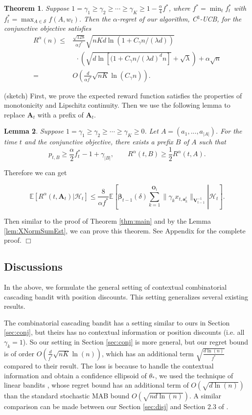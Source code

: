 \documentclass{article}
\newcommand{\bbeta}{\boldsymbol{\beta}}
\newcommand{\EE}{\mathbb{E}}
\newcommand{\bA}{\mathbf{A}}
\newcommand{\ba}{\mathbf{a}}
\newcommand{\bO}{\mathbf{O}}
\newcommand{\bV}{\mathbf{V}}
\newcommand{\cH}{\mathcal{H}}
\newcommand{\cS}{\mathcal{S}}
\newcommand{\abs}[1]{\left| #1 \right|}
\newcommand{\norm}[1]{\| #1 \|}
\newtheorem{theorem}{Theorem}[section]
\newtheorem{lemma}[theorem]{Lemma}%
\newenvironment{proof}{\noindent {\textbf{Proof. }}}{$\Box$ \medskip}
\newcommand{\CLemmaPrefixExi}{
	Suppose $1 = \gamma_1 \geq \gamma_2 \geq \cdots \geq \gamma_K \geq 0$. Let $A = (a_1, ..., a_{\abs{A}})$. For the time $t$ and the conjunctive objective, there exists a prefix $B$ of $A$ such that 
	$$
	p_{t, B} \geq \frac{\alpha}{2}f_{t}^{\ast} - 1 + \gamma_{\abs{B}}, \qquad R^{\alpha}(t, B) \geq \frac{1}{2} R^{\alpha}(t, A).
	$$ 
}
\newcommand{\CEqDeltaEstAnd}{
	$$
	\EE [R^{\alpha}(t, \bA_t) |\cH_t ] \leq \frac{8}{\alpha f^{\ast}} \EE \left[ \left. \bbeta_{t-1}(\delta)\sum_{k=1}^{\bO_t}\norm{\gamma_k x_{t,\ba_k^t}}_{\bV_{t-1}^{-1}} \right| \cH_t\right].
	$$
}
\begin{document}
\begin{theorem} %
	\label{thm:and}
	Suppose $1 = \gamma_1 \geq \gamma_2 \geq \cdots \geq \gamma_{K} \geq 1 - \frac{\alpha}{4} f^{\ast}$, where $f^* = \min_{t} f_t^{\ast}$ with $f_t^{\ast} = \max_{A \in \cS} f(A, w_t)$. Then the $\alpha$-regret of our algorithm, C$^3$-UCB, for the conjunctive objective satisfies
	\begin{align}
		R^{\alpha}(n) \le& \frac{\sqrt{128}}{\alpha f^{\ast}} \sqrt{nKd\ln(1 + C_\gamma n/(\lambda d))} \nonumber \\
		&~~ \cdot \left(\sqrt{d\ln[(1 + C_\gamma n/(\lambda d)^d n] } + \sqrt{\lambda}\right) + \alpha \sqrt{n} \nonumber \\
		=&O\left(\frac{d}{\alpha f^{\ast}}\sqrt{nK} \ln(C_{\gamma} n) \right).
	\end{align}
\end{theorem}
\begin{proof}
	(sketch) First, we prove the expected reward function satisfies the properties of monotonicity and Lipschitz continuity. Then we use the following lemma to replace $\bA_t$ with a prefix of $\bA_t$.
	\begin{lemma}
		\CLemmaPrefixExi
	\end{lemma}
	
	Therefore we can get
	\CEqDeltaEstAnd
	
	Then similar to the proof of Theorem \ref{thm:main} and by the Lemma \ref{lem:XNormSumEst}, we can prove this theorem. See Appendix for the complete proof.
\end{proof}


\subsection{Discussions}
\label{sec:diss}

In the above, we formulate the general setting of contextual combinatorial cascading bandit with position discounts. This setting generalizes several existing results. 

The combinatorial cascading bandit \cite{kveton2015combinatorial} has a setting similar to ours in Section \ref{sec:conj}, but theirs has no contextual information or position discounts (i.e. all $\gamma_k = 1$). So our setting in Section \ref{sec:conj} is more general, but our regret bound is of order $O\left(\frac{d}{f^*}\sqrt{nK}\ln(n)\right)$, which has an additional term $\sqrt{\frac{d\ln(n)}{f^*}}$ compared to their result. The loss is because to handle the contextual information and obtain a confidence ellipsoid of $\theta_{\ast}$, we used the technique of linear bandits \cite{abbasi2011improved}, whose regret bound has an additional term of $O(\sqrt{d\ln(n)})$ than the standard stochastic MAB bound $O(\sqrt{nd\ln(n)})$. A similar comparison can be made between our Section \ref{sec:disj} and Section 2.3 of \cite{kveton2015combinatorial}.
\end{document}
